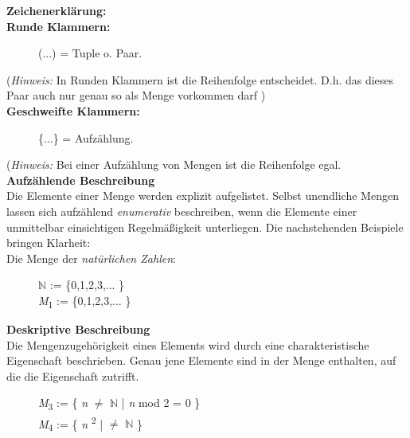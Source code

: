 \newpage    

\textbf{Zeichenerklärung:}\\

\textbf{Runde Klammern:}\\

\begin{figure}[h]
\centering
{(...)} = Tuple o. Paar.\\ 
\end{figure}

(\textit{Hinweis:} In Runden Klammern ist die Reihenfolge entscheidet. D.h. das dieses Paar auch nur genau so als Menge vorkommen darf )\\

\textbf{Geschweifte Klammern:} \\ 

\begin{figure}[h]
\centering
\{...\} = Aufzählung. \\ 
\end{figure}

(\textit{Hinweis:} Bei einer Aufzählung von Mengen ist die Reihenfolge egal.\\




\textbf{Aufzählende Beschreibung}\\
Die Elemente einer Menge werden explizit aufgelistet. Selbst unendliche
Mengen lassen sich aufzählend \textit{enumerativ} beschreiben,
wenn die Elemente einer unmittelbar einsichtigen Regelmäßigkeit
unterliegen. Die nachstehenden Beispiele bringen Klarheit:\\

Die Menge der \textit{natürlichen Zahlen}: \\

\begin{figure}[h]
\centering

$\mathbb{N}$ := \{0,1,2,3,... \}\\
\textit{M}\textsubscript{1} := \{0,1,2,3,... \}\\
\end{figure}

\textbf{Deskriptive Beschreibung}\\
Die Mengenzugehörigkeit eines Elements wird durch eine charakteristische
Eigenschaft beschrieben. Genau jene Elemente sind in der
Menge enthalten, auf die die Eigenschaft zutrifft.\\

\begin{figure}[h]
\centering
\textit{M}\textsubscript{3} := \{ \textit{n} $\neq$ $\mathbb{N}$ | \textit{n} mod 2 = 0 \}\\
\textit{M}\textsubscript{4} := \{ \textit{n} \textsuperscript{2} | $\neq$ $\mathbb{N}$  \}\\
\end{figure}

